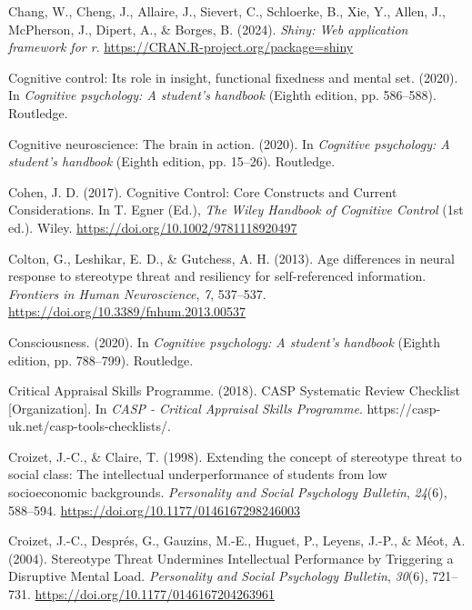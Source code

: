 \documentclass[
  stu, a4paper,floatsintext]{apa7}
\newlength{\cslhangindent}
\newenvironment{CSLReferences}[2] %
 {\begin{list}{}{%
  \setlength{\itemindent}{0pt}
  \setlength{\leftmargin}{0pt}
  \setlength{\parsep}{0pt}
  \ifodd #1
   \setlength{\leftmargin}{\cslhangindent}
   \setlength{\itemindent}{-1\cslhangindent}
  \fi
  \setlength{\itemsep}{#2\baselineskip}}}
 {\end{list}}
\begin{document}
\begin{CSLReferences}{1}{0}
Chang, W., Cheng, J., Allaire, J., Sievert, C., Schloerke, B., Xie, Y., Allen, J., McPherson, J., Dipert, A., \& Borges, B. (2024). \emph{Shiny: Web application framework for r}. \url{https://CRAN.R-project.org/package=shiny}

Cognitive control: Its role in insight, functional fixedness and mental set. (2020). In \emph{Cognitive psychology: A student's handbook} (Eighth edition, pp. 586--588). Routledge.

Cognitive neuroscience: The brain in action. (2020). In \emph{Cognitive psychology: A student's handbook} (Eighth edition, pp. 15--26). Routledge.

Cohen, J. D. (2017). Cognitive {Control}: {Core Constructs} and {Current Considerations}. In T. Egner (Ed.), \emph{The {Wiley Handbook} of {Cognitive Control}} (1st ed.). Wiley. \url{https://doi.org/10.1002/9781118920497}

Colton, G., Leshikar, E. D., \& Gutchess, A. H. (2013). Age differences in neural response to stereotype threat and resiliency for self-referenced information. \emph{Frontiers in Human Neuroscience}, \emph{7}, 537--537. \url{https://doi.org/10.3389/fnhum.2013.00537}

Consciousness. (2020). In \emph{Cognitive psychology: A student's handbook} (Eighth edition, pp. 788--799). Routledge.

Critical Appraisal Skills Programme. (2018). {CASP Systematic Review Checklist} {[}Organization{]}. In \emph{CASP - Critical Appraisal Skills Programme}. https://casp-uk.net/casp-tools-checklists/.

Croizet, J.-C., \& Claire, T. (1998). Extending the concept of stereotype threat to social class: {The} intellectual underperformance of students from low socioeconomic backgrounds. \emph{Personality and Social Psychology Bulletin}, \emph{24}(6), 588--594. \url{https://doi.org/10.1177/0146167298246003}

Croizet, J.-C., Després, G., Gauzins, M.-E., Huguet, P., Leyens, J.-P., \& Méot, A. (2004). Stereotype {Threat Undermines Intellectual Performance} by {Triggering} a {Disruptive Mental Load}. \emph{Personality and Social Psychology Bulletin}, \emph{30}(6), 721--731. \url{https://doi.org/10.1177/0146167204263961}


\end{CSLReferences}
\end{document}
